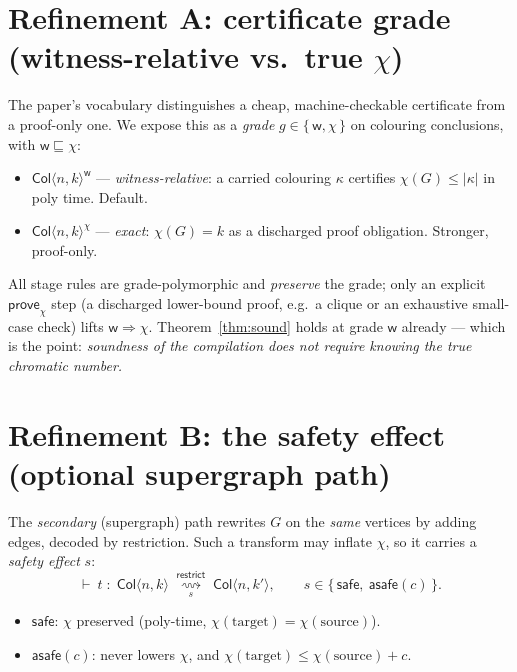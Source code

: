 \documentclass[11pt]{article}
\theoremstyle{definition}
\newcommand{\redtos}[2]{\mathrel{\overset{\textstyle #1}{\underset{#2}{\rightsquigarrow}}}}
\newcommand{\Col}{\mathsf{Col}}
\newcommand{\safe}{\textsf{safe}}
\newcommand{\asafe}[1]{\textsf{asafe}(#1)}
\begin{document}
\section{Refinement A: certificate grade (witness-relative vs.\ true $\chi$)}
\label{sec:grade}

The paper's vocabulary distinguishes a cheap, machine-checkable certificate from a
proof-only one. We expose this as a \emph{grade} $g\in\{\,\mathsf{w},\mathsf{\chi}\,\}$
on colouring conclusions, with $\mathsf{w}\sqsubseteq\mathsf{\chi}$:
\begin{itemize}[leftmargin=1.4em,itemsep=1pt]
  \item $\Col\langle n,k\rangle^{\mathsf{w}}$ --- \emph{witness-relative}: a carried
        colouring $\kappa$ certifies $\chi(G)\le|\kappa|$ in poly time. Default.
  \item $\Col\langle n,k\rangle^{\mathsf{\chi}}$ --- \emph{exact}: $\chi(G)=k$ as a
        discharged proof obligation. Stronger, proof-only.
\end{itemize}
All stage rules are grade-polymorphic and \emph{preserve} the grade; only an
explicit $\mathsf{prove}_\chi$ step (a discharged lower-bound proof, e.g.\ a clique
or an exhaustive small-case check) lifts $\mathsf{w}\Rightarrow\mathsf{\chi}$.
Theorem~\ref{thm:sound} holds at grade $\mathsf{w}$ already --- which is the point:
\emph{soundness of the compilation does not require knowing the true chromatic
number.}

\section{Refinement B: the safety effect (optional supergraph path)}
\label{sec:safety}

The \emph{secondary} (supergraph) path rewrites $G$ on the \emph{same} vertices by
adding edges, decoded by restriction. Such a transform may inflate $\chi$, so it
carries a \emph{safety effect} $s$:
\[
  \vdash\ t \;:\; \Col\langle n,k\rangle \;\redtos{\mathsf{restrict}}{s}\; \Col\langle n,k'\rangle,
  \qquad
  s\in\{\,\safe,\ \asafe{c}\,\}.
\]
\begin{itemize}[leftmargin=1.4em,itemsep=1pt]
  \item $\safe$: $\chi$ preserved (poly-time, $\chi(\text{target})=\chi(\text{source})$).
  \item $\asafe{c}$: never lowers $\chi$, and $\chi(\text{target})\le\chi(\text{source})+c$.
\end{itemize}
\end{document}
